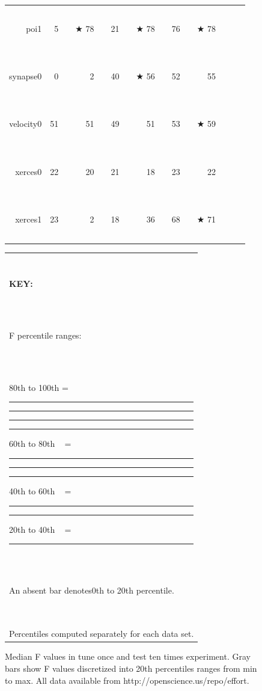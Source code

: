 \documentclass{sig-alternative}
\newcommand{\crule}[3][darkgray]{\textcolor{#1}{\rule{#2}{#3}}}
\newcommand{\rone}{\crule{1mm}{1.95mm}}
\newcommand{\rtwo}{\crule{1mm}{1.95mm}\hspace{0.3pt}\crule{1mm}{1.95mm}}
\newcommand{\rthree}{\crule{1mm}{1.95mm}\hspace{0.3pt}\crule{1mm}{1.95mm}\hspace{0.3pt}\crule{1mm}{1.95mm}}
\newcommand{\rfour}{\crule{1mm}{1.95mm}\hspace{0.3pt}\crule{1mm}{1.95mm}\hspace{0.3pt}\crule{1mm}{1.95mm}\hspace{0.3pt}\crule{1mm}{1.95mm}}
\begin{document}
\begin{figure}
\begin{minipage}{0.81\linewidth}
\begin{tabular}{r@{~}|r@{~}l|r@{~}l@{~}|r@{~}l|r@{~}@{~}l|@{~}r@{~}l|r@{~}l|@{~}r@{~}l}
poi1 & 5 &         &$\bigstar$ 78 & {\rfour} & 21 & {\rone} &$\bigstar$ 78 & {\rfour} & 76 & {\rfour} &$\bigstar$ 78 & {\rfour}\\
synapse0 & 0 &         & 2 &         & 40 & {\rthree} &$\bigstar$ 56 & {\rfour} & 52 & {\rfour} & 55 & {\rfour}\\
velocity0 & 51 &         & 51 &         & 49 &         & 51 &         & 53 & {\rone} &$\bigstar$ 59 & {\rfour}\\
xerces0 & 22 & {\rthree} & 20 & {\rone} & 21 & {\rtwo} & 18 &         & 23 & {\rfour} & 22 & {\rthree}\\
xerces1 & 23 & {\rone} & 2 &         & 18 & {\rone} & 36 & {\rtwo} & 68 & {\rfour} &$\bigstar$ 71 & {\rfour}\\
\end{tabular}
\end{minipage}\begin{minipage}{.15\linewidth}
\begin{tabular}{|p{\linewidth}|}\hline

~\\

{\bf KEY:}

~\\

F percentile ranges:

~\\

80th to 100th = {\rfour}

60th to 80th ~ = {\rthree}

40th to 60th  ~ = {\rtwo}

20th to 40th  ~ = {\rone}

~\\

An absent bar denotes\newline 0th to 20th percentile.

~\\

Percentiles computed  separately
for each data set.\\\hline
\end{tabular}
\end{minipage}
\caption{Median F values in tune once and test ten times experiment. 
Gray bars  show  F values
discretized into 20th percentiles ranges from min to max.
All data available from http://openscience.us/repo/effort.
}\label{fig:nonc}
\end{figure}

\end{document}
